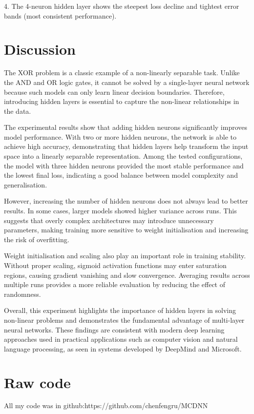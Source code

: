 \documentclass[11pt]{article}
\begin{document}
4. The 4-neuron hidden layer shows the steepest loss decline and tightest error bands (most consistent performance).

\section{ Discussion}

The XOR problem is a classic example of a non-linearly separable task. Unlike the AND and OR logic gates, it cannot be solved by a single-layer neural network because such models can only learn linear decision boundaries. Therefore, introducing hidden layers is essential to capture the non-linear relationships in the data.

The experimental results show that adding hidden neurons significantly improves model performance. With two or more hidden neurons, the network is able to achieve high accuracy, demonstrating that hidden layers help transform the input space into a linearly separable representation. Among the tested configurations, the model with three hidden neurons provided the most stable performance and the lowest final loss, indicating a good balance between model complexity and generalisation.

However, increasing the number of hidden neurons does not always lead to better results. In some cases, larger models showed higher variance across runs. This suggests that overly complex architectures may introduce unnecessary parameters, making training more sensitive to weight initialisation and increasing the risk of overfitting.

Weight initialisation and scaling also play an important role in training stability. Without proper scaling, sigmoid activation functions may enter saturation regions, causing gradient vanishing and slow convergence. Averaging results across multiple runs provides a more reliable evaluation by reducing the effect of randomness.

Overall, this experiment highlights the importance of hidden layers in solving non-linear problems and demonstrates the fundamental advantage of multi-layer neural networks. These findings are consistent with modern deep learning approaches used in practical applications such as computer vision and natural language processing, as seen in systems developed by DeepMind and Microsoft.

\section{Raw code}
All my code was in github:https://github.com/chenfengru/MCDNN
\end{document}
